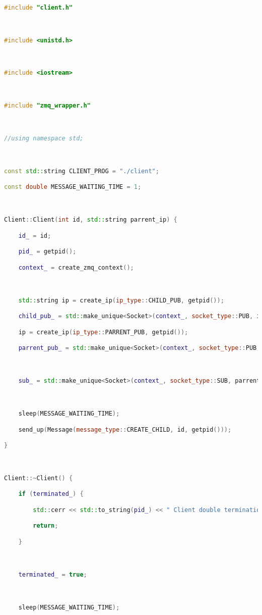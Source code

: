 \begin{lstlisting}[language=C++]

#include "client.h"



#include <unistd.h>



#include <iostream>



#include "zmq_wrapper.h"



//using namespace std;



const std::string CLIENT_PROG = "./client";

const double MESSAGE_WAITING_TIME = 1;



Client::Client(int id, std::string parrent_ip) {

    id_ = id;

    pid_ = getpid();

    context_ = create_zmq_context();



    std::string ip = create_ip(ip_type::CHILD_PUB, getpid());

    child_pub_ = std::make_unique<Socket>(context_, socket_type::PUB, ip);

    ip = create_ip(ip_type::PARRENT_PUB, getpid());

    parrent_pub_ = std::make_unique<Socket>(context_, socket_type::PUB, ip);



    sub_ = std::make_unique<Socket>(context_, socket_type::SUB, parrent_ip);



    sleep(MESSAGE_WAITING_TIME);

    send_up(Message(message_type::CREATE_CHILD, id, getpid()));

}



Client::~Client() {

    if (terminated_) {

        std::cerr << std::to_string(pid_) << " Client double termination" << std::endl;

        return;

    }



    terminated_ = true;



    sleep(MESSAGE_WAITING_TIME);


\end{lstlisting}
